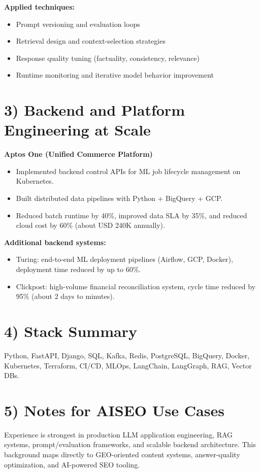 \documentclass[11pt]{article}
\begin{document}
\textbf{Applied techniques:}
\begin{itemize}[leftmargin=1.2em]
  \item Prompt versioning and evaluation loops
  \item Retrieval design and context-selection strategies
  \item Response quality tuning (factuality, consistency, relevance)
  \item Runtime monitoring and iterative model behavior improvement
\end{itemize}

\section*{3) Backend and Platform Engineering at Scale}
\textbf{Aptos One (Unified Commerce Platform)}
\begin{itemize}[leftmargin=1.2em]
  \item Implemented backend control APIs for ML job lifecycle management on Kubernetes.
  \item Built distributed data pipelines with Python + BigQuery + GCP.
  \item Reduced batch runtime by 40\%, improved data SLA by 35\%, and reduced cloud cost by 60\% (about USD 240K annually).
\end{itemize}

\textbf{Additional backend systems:}
\begin{itemize}[leftmargin=1.2em]
  \item Turing: end-to-end ML deployment pipelines (Airflow, GCP, Docker), deployment time reduced by up to 60\%.
  \item Clickpost: high-volume financial reconciliation system, cycle time reduced by 95\% (about 2 days to minutes).
\end{itemize}

\section*{4) Stack Summary}
Python, FastAPI, Django, SQL, Kafka, Redis, PostgreSQL, BigQuery, Docker, Kubernetes, Terraform, CI/CD, MLOps, LangChain, LangGraph, RAG, Vector DBs.

\section*{5) Notes for AISEO Use Cases}
Experience is strongest in production LLM application engineering, RAG systems, prompt/evaluation frameworks, and scalable backend architecture. This background maps directly to GEO-oriented content systems, answer-quality optimization, and AI-powered SEO tooling.
\end{document}
